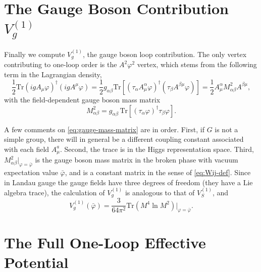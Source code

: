 \section{The Gauge Boson Contribution \texorpdfstring{$V_g^{(1)}$}{Vg}}

Finally we compute $V_g^{(1)}$, the gauge boson loop contribution. The
only vertex contributing to one-loop order is the $A^2\varphi^2$ vertex,
which stems from the following term in the Lagrangian density,
\begin{equation}
    \frac{1}{2}\mathrm{Tr}(igA_\mu\varphi)^\dagger(igA^\mu\varphi)
    = \frac{1}{2}g_{\alpha\beta}\mathrm{Tr}
    \!\left[(\tau_\alpha A^\alpha_\mu\varphi)^\dagger
    (\tau_\beta A^{\beta\mu}\varphi)\right]
    = \frac{1}{2}A^\alpha_\mu M^2_{\alpha\beta}A^{\beta\mu},
\end{equation}
with the field-dependent gauge boson mass matrix
\begin{equation}
    M^2_{\alpha\beta} = g_{\alpha\beta}\,
    \mathrm{Tr}\!\left[(\tau_\alpha\varphi)^\dagger\tau_\beta\varphi\right].
    \label{eq:gauge-mass-matrix}
\end{equation}


A few comments on \eqref{eq:gauge-mass-matrix} are in order. First, if
$G$ is not a simple group, there will in general be a different coupling
constant associated with each field $A^a_\mu$. Second, the trace is in
the Higgs representation space. Third, $M^2_{\alpha\beta}|_{\varphi=
\bar\varphi}$ is the gauge boson mass matrix in the broken phase with
vacuum expectation value $\bar\varphi$, and is a constant matrix in the
sense of \eqref{eq:Wij-def}. Since in Landau gauge the gauge fields have
three degrees of freedom (they have a Lie algebra trace), the calculation
of $V_g^{(1)}$ is analogous to that of $V_S^{(1)}$, and
\begin{equation}
    V_g^{(1)}(\bar\varphi) = \frac{3}{64\pi^2}
    \mathrm{Tr}(M^4\ln M^2)\big|_{\varphi=\bar\varphi}.
    \label{eq:Vg1}
\end{equation}

\section{The Full One-Loop Effective Potential}


